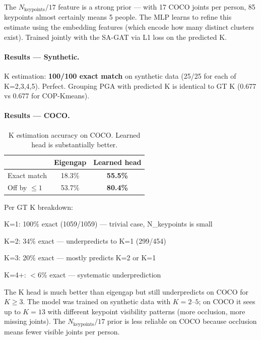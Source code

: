 The $N_{\text{keypoints}} / 17$ feature is a strong prior --- with 17 COCO joints per person, 85 keypoints almost certainly means 5 people. The MLP learns to refine this estimate using the embedding features (which encode how many distinct clusters exist). Trained jointly with the SA-GAT via L1 loss on the predicted K.

\paragraph{Results --- Synthetic.}

K estimation: \textbf{100/100 exact match} on synthetic data (25/25 for each of K=2,3,4,5). Perfect. Grouping PGA with predicted K is identical to GT K (0.677 vs 0.677 for COP-Kmeans).

\paragraph{Results --- COCO.}

\begin{table}[H]
\centering
\footnotesize
\begin{tabular}{lcc}
\toprule
 & Eigengap & Learned head \\
\midrule
Exact match & 18.3\% & \textbf{55.5\%} \\
Off by $\leq 1$ & 53.7\% & \textbf{80.4\%} \\
\bottomrule
\end{tabular}
\caption{K estimation accuracy on COCO. Learned head is substantially better.}
\end{table}

Per GT K breakdown:
\begin{compactitem}
  \item K=1: 100\% exact (1059/1059) --- trivial case, N\_keypoints is small
  \item K=2: 34\% exact --- underpredicts to K=1 (299/454)
  \item K=3: 20\% exact --- mostly predicts K=2 or K=1
  \item K=4+: $<$6\% exact --- systematic underprediction
\end{compactitem}

The K head is much better than eigengap but still underpredicts on COCO for $K \geq 3$. The model was trained on synthetic data with $K = 2$--$5$; on COCO it sees up to $K = 13$ with different keypoint visibility patterns (more occlusion, more missing joints). The $N_{\text{keypoints}} / 17$ prior is less reliable on COCO because occlusion means fewer visible joints per person.


